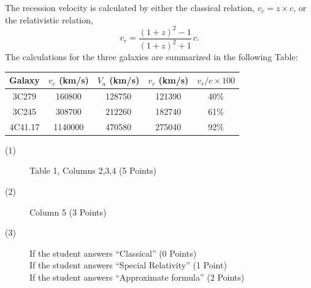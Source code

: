 The recession velocity is calculated by either the classical relation,
$v_c = z\times c$, or the relativistic relation,
\[
v_r = \frac{(1+z)^2 - 1}{(1+z)^2 + 1}\,c.
\]
The calculations for the three galaxies are summarized in the following
Table:

\begin{center}
\begin{tabular}{|c|c|c|c|c|}
\hline
Galaxy & $v_c$ (km/s) & $V_a$ (km/s) & $v_r$ (km/s) & $v_r/c \times 100$\\
\hline
3C279 & 160800 & 128750 & 121390 & 40\%\\
\hline
3C245 & 308700 & 212260 & 182740 & 61\%\\
\hline
4C41.17 & 1140000 & 470580 & 275040 & 92\%\\
\hline
\end{tabular}
\end{center}

\begin{description}
\item[(1)] Table 1, Columns 2,3,4 \hfill(5 Points)
\item[(2)] Column 5 \hfill(3 Points)
\item[(3)] If the student answers ``Classical'' \hfill(0 Points)\\
  If the student answers ``Special Relativity'' \hfill(1 Point)\\
  If the student answers ``Approximate formula'' \hfill(2 Points)
\end{description}
